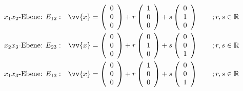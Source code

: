 \begin{equation*}
    \begin{aligned}
        x_1x_2\text{-Ebene: } & E_{12}: & \vv{x} = \left(\begin{array}{c}  0 \\ 0\\ 0 \end{array}\right) + r \left(\begin{array}{c}  1 \\ 0 \\ 0 \end{array}\right) + s \left(\begin{array}{c}  0 \\ 1 \\ 0 \end{array}\right) \qquad ; r,s \in \mathbb{R} \\
        x_2x_3\text{-Ebene: } & E_{23}: & \vv{x} = \left(\begin{array}{c}  0 \\ 0\\ 0 \end{array}\right) + r \left(\begin{array}{c}  0 \\ 1 \\ 0 \end{array}\right) + s \left(\begin{array}{c}  0 \\ 0 \\ 1 \end{array}\right) \qquad ; r,s \in \mathbb{R} \\
        x_1x_3\text{-Ebene: } & E_{13}: & \vv{x} = \left(\begin{array}{c}  0 \\ 0\\ 0 \end{array}\right) + r \left(\begin{array}{c}  1 \\ 0 \\ 0 \end{array}\right) + s \left(\begin{array}{c}  0 \\ 0 \\ 1 \end{array}\right) \qquad ; r,s \in \mathbb{R} 
    \end{aligned}
\end{equation*}


\pagebreak

